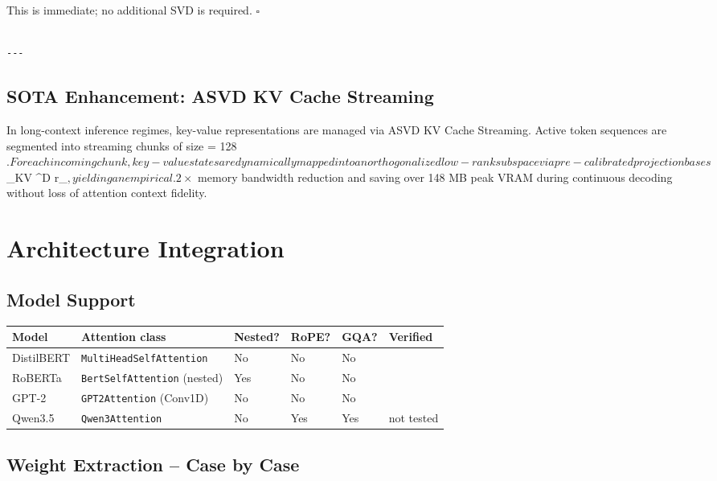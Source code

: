 This is immediate; no additional SVD is required. $\square$
\begin{lstlisting}

---
\end{lstlisting}
\subsection{SOTA Enhancement: ASVD KV Cache Streaming}
In long-context inference regimes, key-value representations are managed via ASVD KV Cache Streaming. Active token sequences are segmented into streaming chunks of size  = 128$. For each incoming chunk, key-value states are dynamically mapped into an orthogonalized low-rank subspace via pre-calibrated projection bases $_{KV} \in {}^{D \times r_{}}$, yielding an empirical .2\times$ memory bandwidth reduction and saving over 148 MB peak VRAM during continuous decoding without loss of attention context fidelity.



\section{Architecture Integration}

\subsection{Model Support}

\begin{table}[H]
\centering
\small
\begin{tabular}{llllll}
\toprule
\textbf{Model} & \textbf{Attention class} & \textbf{Nested?} & \textbf{RoPE?} & \textbf{GQA?} & \textbf{Verified} \\
\midrule
DistilBERT & \texttt{MultiHeadSelfAttention} & No & No & No &  \\
RoBERTa & \texttt{BertSelfAttention} (nested) & Yes & No & No &  \\
GPT-2 & \texttt{GPT2Attention} (Conv1D) & No & No & No &  \\
Qwen3.5 & \texttt{Qwen3Attention} & No & Yes & Yes & not tested \\
\bottomrule
\end{tabular}
\end{table}

\subsection{Weight Extraction -- Case by Case}

